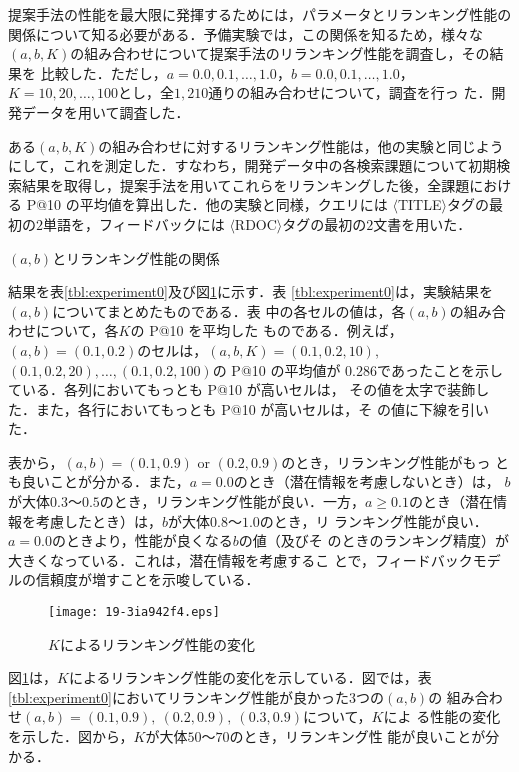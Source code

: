 \documentclass[japanese]{jnlp_1.4}
\begin{document}
提案手法の性能を最大限に発揮するためには，パラメータとリランキング性能の
関係について知る必要がある．予備実験では，この関係を知るため，様々な$(a,
b, K)$の組み合わせについて提案手法のリランキング性能を調査し，その結果を
比較した．ただし，$a = 0.0, 0.1, \dots, 1.0$，$b = 0.0, 0.1, \dots, 1.0$，
$K = 10, 20, \dots, 100$とし，全$1,210$通りの組み合わせについて，調査を行っ
た．開発データを用いて調査した．

ある$(a, b, K)$の組み合わせに対するリランキング性能は，他の実験と同じよう
にして，これを測定した．すなわち，開発データ中の各検索課題について初期検
索結果を取得し，提案手法を用いてこれらをリランキングした後，全課題におけ
る P@10 の平均値を算出した．他の実験と同様，クエリには
$\langle$TITLE$\rangle$タグの最初の$2$単語を，フィードバックには
$\langle$RDOC$\rangle$タグの最初の$2$文書を用いた．

\begin{table}[b]
  \caption{$(a, b)$とリランキング性能の関係}
  \label{tbl:experiment0}

\end{table}

結果を表\ref{tbl:experiment0}及び図\ref{fig:K}に示す．表
\ref{tbl:experiment0}は，実験結果を$(a, b)$についてまとめたものである．表
中の各セルの値は，各$(a, b)$の組み合わせについて，各$K$の P@10 を平均した
ものである．例えば，$(a, b) = (0.1, 0.2)$のセルは，$(a, b, K) = (0.1,
0.2, 10),$ $(0.1, 0.2, 20), \dots, (0.1, 0.2, 100)$の P@10 の平均値が
$0.286$であったことを示している．各列においてもっとも P@10 が高いセルは，
その値を太字で装飾した．また，各行においてもっとも P@10 が高いセルは，そ
の値に下線を引いた．

表から，$(a, b) = (0.1, 0.9)$ or $(0.2, 0.9)$のとき，リランキング性能がもっ
とも良いことが分かる．また，$a = 0.0$のとき（潜在情報を考慮しないとき）は，
$b$が大体$0.3$〜$0.5$のとき，リランキング性能が良い．一方，$a \geq
0.1$のとき（潜在情報を考慮したとき）は，$b$が大体$0.8$〜$1.0$のとき，リ
ランキング性能が良い．$a = 0.0$のときより，性能が良くなる$b$の値（及びそ
のときのランキング精度）が大きくなっている．これは，潜在情報を考慮するこ
とで，フィードバックモデルの信頼度が増すことを示唆している．

\begin{figure}[t]
 \begin{center}
  \texttt{[image: 19-3ia942f4.eps]}
 \end{center}
  \caption{$K$によるリランキング性能の変化}
  \label{fig:K}
\end{figure}

図\ref{fig:K}は，$K$によるリランキング性能の変化を示している．図では，表
\ref{tbl:experiment0}においてリランキング性能が良かった$3$つの$(a, b)$の
組み合わせ$(a, b) = (0.1, 0.9),\ (0.2, 0.9),\ (0.3, 0.9)$について，$K$によ
る性能の変化を示した．図から，$K$が大体$50$〜$70$のとき，リランキング性
能が良いことが分かる．
\end{document}
